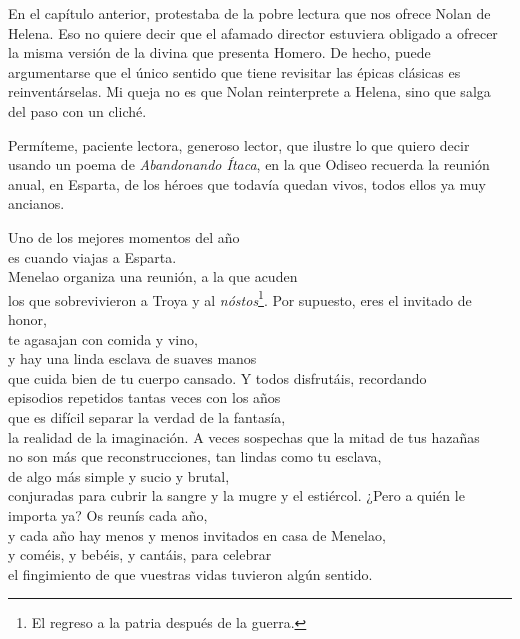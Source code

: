 \label{cap:menelao}

En el capítulo anterior, protestaba de la pobre lectura que nos ofrece Nolan de Helena. Eso no quiere decir que el afamado director estuviera obligado a ofrecer la misma versión de la divina que presenta Homero. De hecho, puede argumentarse que el único sentido que tiene revisitar las épicas clásicas es reinventárselas. Mi queja no es que Nolan reinterprete a Helena, sino que salga del paso con un cliché.

Permíteme, paciente lectora, generoso lector, que ilustre lo que quiero decir usando un poema de \emph{Abandonando Ítaca}, en la que Odiseo recuerda la reunión anual, en Esparta, de los héroes que todavía quedan vivos, todos ellos ya muy ancianos.

\begin{versopropio}
Uno de los mejores momentos del año\\
es cuando viajas a Esparta.\\
Menelao organiza una reunión, a la que acuden\\
los que sobrevivieron a Troya y al \emph{nóstos}\footnote{El regreso a la patria después de la guerra.}.
\stanzabreak
Por supuesto, eres el invitado de honor,\\
te agasajan con comida y vino,\\
y hay una linda esclava de suaves manos\\
que cuida bien de tu cuerpo cansado.
\stanzabreak
Y todos disfrutáis, recordando\\
episodios repetidos tantas veces con los años\\
que es difícil separar la verdad de la fantasía,\\
la realidad de la imaginación.
\stanzabreak
A veces sospechas que la mitad de tus hazañas\\
no son más que reconstrucciones, tan lindas como tu esclava,\\
de algo más simple y sucio y brutal,\\
conjuradas para cubrir la sangre y la mugre y el estiércol.
\stanzabreak
¿Pero a quién le importa ya? Os reunís cada año,\\
y cada año hay menos y menos invitados en casa de Menelao,\\
y coméis, y bebéis, y cantáis, para celebrar\\
el fingimiento de que vuestras vidas tuvieron algún sentido.
\end{versopropio}


